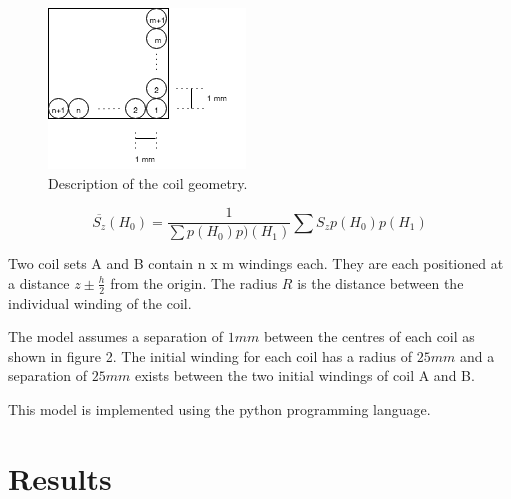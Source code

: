 \documentclass[%
 reprint,
 amsmath,
 amssymb,
 aps,
]{revtex4-1}
\begin{document}
	\begin{figure}[H]
 	\includegraphics[width=\linewidth]{coil2.png}
 	\caption{Description of the coil geometry.}
  	\label{fig:boat1}
	\end{figure}
	
	
	\begin{equation}
	\overline{S_z}(H_0) = \frac{1}{\sum p(H_0)p)(H_1)}\sum S_z p(H_0) p(H_1)
	\end{equation}
	
	
	Two coil sets A and B contain n x m windings each. They are each positioned at a distance $z\pm\frac{h}{2}$ from the origin. The radius $R$ is the distance between the individual winding of the coil.

	
	
The model assumes a separation of $1mm$ between the centres of each coil as shown in figure 2. The initial winding for each coil has a radius of $25mm$ and a separation of $25mm$ exists between the two initial windings of coil A and B.

	
	
This model is implemented using the python programming language. 
	
\section{\label{sec:level1}Results}
\end{document}
